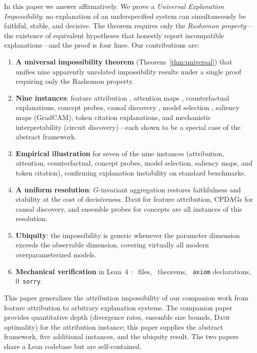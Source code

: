 \documentclass[twoside]{jmlr}
\newcommand{\DASH}{\textsc{Dash}}
\begin{document}
In this paper we answer affirmatively.  We prove a \emph{Universal Explanation
Impossibility}: no explanation of an underspecified system can simultaneously
be faithful, stable, and decisive.  The theorem requires only the
\emph{Rashomon property}---the existence of equivalent hypotheses that
honestly report incompatible explanations---and the proof is four lines.
Our contributions are:
\begin{enumerate}
  \item \textbf{A universal impossibility theorem}
    (Theorem~\ref{thm:universal}) that unifies nine apparently unrelated
    impossibility results under a single proof requiring only the Rashomon
    property.
  \item \textbf{Nine instances}: feature attribution
    \citep{bilodeau2024impossibility}, attention maps
    \citep{jainwallace2019}, counterfactual explanations, concept probes,
    causal discovery \citep{verma1991equivalence}, model selection
    \citep{rudin2024amazing}, saliency maps (GradCAM), token citation
    explanations, and mechanistic interpretability (circuit
    discovery)---each shown to be a special case of the abstract framework.
  \item \textbf{Empirical illustration} for seven of the nine instances
    (attribution, attention, counterfactual, concept probes, model selection,
    saliency maps, and token citation),
    confirming explanation instability on standard benchmarks.
  \item \textbf{A uniform resolution}: $G$-invariant aggregation restores
    faithfulness and stability at the cost of decisiveness.  \DASH{} for
    feature attribution, CPDAGs for causal discovery, and ensemble probes
    for concepts are all instances of this resolution.
  \item \textbf{Ubiquity}: the impossibility is generic whenever the
    parameter dimension exceeds the observable dimension, covering
    virtually all modern overparameterized models.
  \item \textbf{Mechanical verification} in Lean~4
    \citep{demoura2021lean4}: \ClaimMainFiles~files, \ClaimMainTheorems~theorems, \ClaimMainAxioms~\texttt{axiom} declarations,
    0~\texttt{sorry}.
\end{enumerate}

This paper generalizes the attribution impossibility of our companion work
\citep{bilodeau2024impossibility} from feature attribution to arbitrary
explanation systems.  The companion paper provides quantitative depth
(divergence rates, ensemble size bounds, \DASH{} optimality) for the
attribution instance; this paper supplies the abstract framework, five
additional instances, and the ubiquity result.  The two papers share a
Lean codebase but are self-contained.
\end{document}
